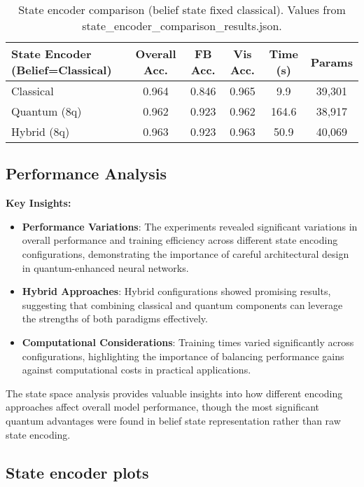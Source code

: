 \documentclass[11pt]{article}
\begin{document}
\begin{table}[h]
\centering
\begin{tabular}{lccccc}
\toprule
\textbf{State Encoder (Belief=Classical)} & \textbf{Overall Acc.} & \textbf{FB Acc.} & \textbf{Vis Acc.} & \textbf{Time (s)} & \textbf{Params} \\
\midrule
Classical & 0.964 & 0.846 & 0.965 & 9.9 & 39,301 \\
Quantum (8q) & 0.962 & 0.923 & 0.962 & 164.6 & 38,917 \\
Hybrid (8q) & 0.963 & 0.923 & 0.963 & 50.9 & 40,069 \\
\bottomrule
\end{tabular}
\caption{State encoder comparison (belief state fixed classical). Values from state\_encoder\_comparison\_results.json.}
\end{table}

\subsection{Performance Analysis}

\textbf{Key Insights:}
\begin{itemize}
    \item \textbf{Performance Variations}: The experiments revealed significant variations in overall performance and training efficiency across different state encoding configurations, demonstrating the importance of careful architectural design in quantum-enhanced neural networks.
    \item \textbf{Hybrid Approaches}: Hybrid configurations showed promising results, suggesting that combining classical and quantum components can leverage the strengths of both paradigms effectively.
    \item \textbf{Computational Considerations}: Training times varied significantly across configurations, highlighting the importance of balancing performance gains against computational costs in practical applications.
\end{itemize}

The state space analysis provides valuable insights into how different encoding approaches affect overall model performance, though the most significant quantum advantages were found in belief state representation rather than raw state encoding.

\subsection{State encoder plots}
\end{document}
